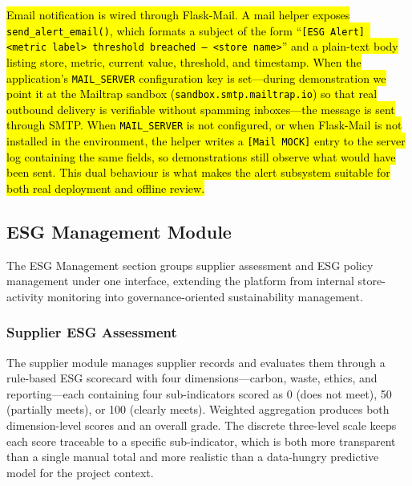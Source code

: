 \documentclass[11pt,a4paper]{article}
\newcommand{\new}[1]{\hl{#1}}
\begin{document}
\new{Email notification is wired through Flask-Mail. A mail helper exposes \texttt{send\_alert\_email()}, which formats a subject of the form ``\texttt{[ESG Alert] <metric label> threshold breached --- <store name>}'' and a plain-text body listing store, metric, current value, threshold, and timestamp. When the application's \texttt{MAIL\_SERVER} configuration key is set---during demonstration we point it at the Mailtrap sandbox (\texttt{sandbox.smtp.mailtrap.io}) so that real outbound delivery is verifiable without spamming inboxes---the message is sent through SMTP. When \texttt{MAIL\_SERVER} is not configured, or when Flask-Mail is not installed in the environment, the helper writes a \texttt{[Mail MOCK]} entry to the server log containing the same fields, so demonstrations still observe what would have been sent. This dual behaviour is what makes the alert subsystem suitable for both real deployment and offline review.}

\subsection{ESG Management Module}
The ESG Management section groups supplier assessment and ESG policy management under one interface, extending the platform from internal store-activity monitoring into governance-oriented sustainability management.

\subsubsection{Supplier ESG Assessment}
The supplier module manages supplier records and evaluates them through a rule-based ESG scorecard with four dimensions---carbon, waste, ethics, and reporting---each containing four sub-indicators scored as 0 (does not meet), 50 (partially meets), or 100 (clearly meets). Weighted aggregation produces both dimension-level scores and an overall grade. The discrete three-level scale keeps each score traceable to a specific sub-indicator, which is both more transparent than a single manual total and more realistic than a data-hungry predictive model for the project context.
\end{document}
